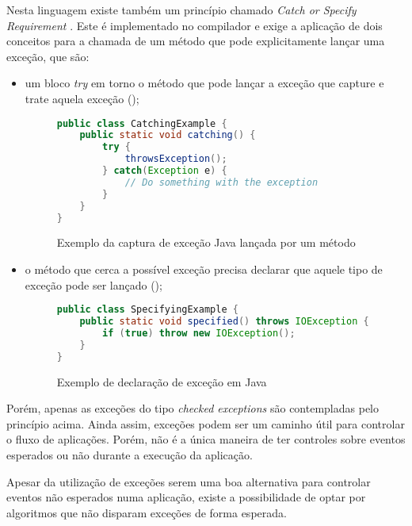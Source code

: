 Nesta linguagem existe também um princípio chamado \textit{Catch or Specify Requirement} \cite{java_catch_or_specify_requirement}. Este é implementado no compilador e exige a aplicação de dois conceitos para a chamada de um método que pode explicitamente lançar uma exceção, que são:

\begin{itemize}
    \item um bloco \textit{try} em torno o método que pode lançar a exceção que capture e trate aquela exceção ();
        \begin{figure}[H]
            \centering
            \begin{lstlisting}[language=Java]
public class CatchingExample {
    public static void catching() {
        try {
            throwsException();
        } catch(Exception e) {
            // Do something with the exception
        }
    }
}
            \end{lstlisting}
            \caption{Exemplo da captura de exceção Java lançada por um método}
            \label{fig:java_catching_exception}
        \end{figure}
    \item o método que cerca a possível exceção precisa declarar que aquele tipo de exceção pode ser lançado ();
        \begin{figure}[H]
            \centering
            \begin{lstlisting}[language=Java]
public class SpecifyingExample {
    public static void specified() throws IOException {
        if (true) throw new IOException();
    }
}
            \end{lstlisting}
            \caption{Exemplo de declaração de exceção em Java}
            \label{fig:java_declaring_exception}
        \end{figure}
\end{itemize}

Porém, apenas as exceções do tipo \textit{checked exceptions} são contempladas pelo princípio acima. Ainda assim, exceções podem ser um caminho útil para controlar o fluxo de aplicações. Porém, não é a única maneira de ter controles sobre eventos esperados ou não durante a execução da aplicação.

Apesar da utilização de exceções serem uma boa alternativa para controlar eventos não esperados numa aplicação, existe a possibilidade de optar por algoritmos que não disparam exceções de forma esperada.

